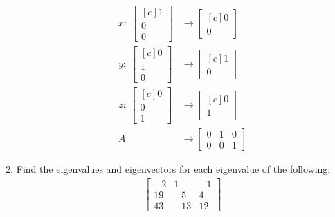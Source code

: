 \documentclass[a4paper,11pt]{article}
\begin{document}
\begin{preview}
\begin{enumerate}
        \begin{align*}
        	x: \; \begin{bmatrix}[c]
            	1\\
				0\\
				0
        	\end{bmatrix} &\rightarrow
			\begin{bmatrix}[c]
            	0\\
				0
        	\end{bmatrix}\\
			y: \; \begin{bmatrix}[c]
            	0\\
				1\\
				0
        	\end{bmatrix} &\rightarrow
			\begin{bmatrix}[c]
            	1\\
				0
        	\end{bmatrix}\\
			z: \; \begin{bmatrix}[c]
            	0\\
				0\\
				1
        	\end{bmatrix} &\rightarrow
			\begin{bmatrix}[c]
            	0\\
				1
        	\end{bmatrix}\\
			A &\rightarrow 
			\begin{bmatrix}
				0&1&0\\
				0&0&1
        	\end{bmatrix}
    	\end{align*}

        \item Find the eigenvalues and eigenvectors for each eigenvalue of the following: 
        \begin{align*}
              \begin{bmatrix}-2&1&-1\\ 19&-5&4\\ 43&-13&12\end{bmatrix}
        \end{align*}


\end{enumerate}
\end{preview}
\end{document}
